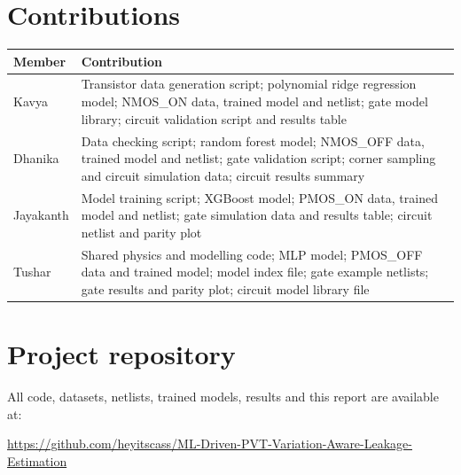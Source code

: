 \documentclass[10pt]{article}
\begin{document}
\section{Contributions}

\begin{table}[H]
\centering
\small
\begin{tabularx}{\textwidth}{@{}p{2.6cm}L@{}}
\toprule
Member & Contribution \\
\midrule
Kavya &
Transistor data generation script; polynomial ridge regression model; NMOS\_ON data, trained model
and netlist; gate model library; circuit validation script and results table \\
\midrule
Dhanika &
Data checking script; random forest model; NMOS\_OFF data, trained model and netlist; gate
validation script; corner sampling and circuit simulation data; circuit results summary \\
\midrule
Jayakanth &
Model training script; XGBoost model; PMOS\_ON data, trained model and netlist; gate simulation
data and results table; circuit netlist and parity plot \\
\midrule
Tushar &
Shared physics and modelling code; MLP model; PMOS\_OFF data and trained model; model index file;
gate example netlists; gate results and parity plot; circuit model library file \\
\bottomrule
\end{tabularx}
\end{table}

\section{Project repository}

All code, datasets, netlists, trained models, results and this report are available at:

\begin{center}
\url{https://github.com/heyitscass/ML-Driven-PVT-Variation-Aware-Leakage-Estimation}
\end{center}
\end{document}
